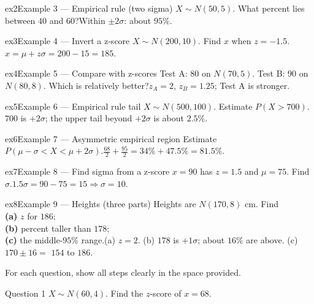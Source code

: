 \documentclass[11pt]{article}
\begin{document}
\begin{example}{ex2}{Example 3 --- Empirical rule (two sigma)}
$X\sim N(50,5)$. What percent lies between $40$ and $60$?\soln Within $\pm2\sigma$: about $95\%$.
\end{example}

\begin{example}{ex3}{Example 4 --- Invert a z-score}
$X\sim N(200,10)$. Find $x$ when $z=-1.5$.\soln $x=\mu+z\sigma=200-15=185$.
\end{example}

\begin{example}{ex4}{Example 5 --- Compare with z-scores}
Test A: $80$ on $N(70,5)$. Test B: $90$ on $N(80,8)$. Which is relatively better?\soln $z_A=2$, $z_B=1.25$; Test A is stronger.
\end{example}

\begin{example}{ex5}{Example 6 --- Empirical rule tail}
$X\sim N(500,100)$. Estimate $P(X>700)$.\soln $700$ is $+2\sigma$; the upper tail beyond $+2\sigma$ is about $2.5\%$.
\end{example}

\begin{example}{ex6}{Example 7 --- Asymmetric empirical region}
Estimate $P(\mu-\sigma<X<\mu+2\sigma)$.\soln $\tfrac{68}{2}+\tfrac{95}{2}=34\%+47.5\%=81.5\%$.
\end{example}

\begin{example}{ex7}{Example 8 --- Find sigma from a z-score}
$x=90$ has $z=1.5$ and $\mu=75$. Find $\sigma$.\soln $1.5\sigma=90-75=15\Rightarrow\sigma=10$.
\end{example}

\begin{example}{ex8}{Example 9 --- Heights (three parts)}
Heights are $N(170,8)$ cm. Find \\ \textbf{(a)} $z$ for $186$; \\ \textbf{(b)} percent taller than $178$; \\ \textbf{(c)} the middle-$95\%$ range.\soln (a) $z=2$. (b) $178$ is $+1\sigma$; about $16\%$ are above. (c) $170\pm16=$ $154$ to $186$.
\end{example}

\clearpage
{}
For each question, show all steps clearly in the space provided.

\begin{qbox}{Question 1}
$X\sim N(60,4)$. Find the $z$-score of $x=68$.\workspace{2.4cm}
\end{qbox}
\end{document}
